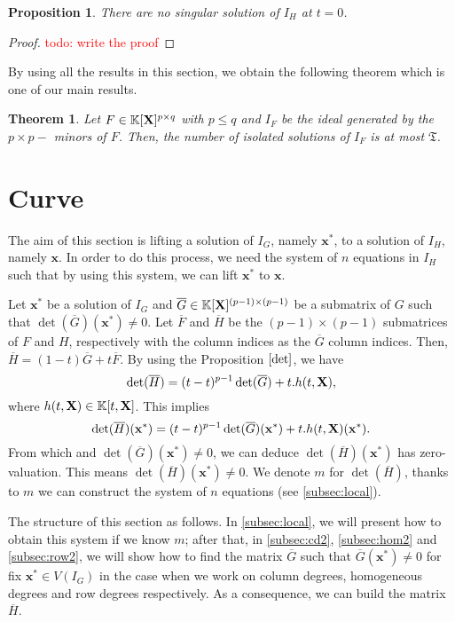 \documentclass[11pt]{article}
\numberwithin{Property}{section}
\newtheorem{Theorem}{Theorem}%
\numberwithin{Theorem}{section}
\newtheorem{Proposition}{Proposition}%
\numberwithin{Proposition}{section}
\numberwithin{Lemma}{section}
\numberwithin{Corollary}{section}
\numberwithin{Definition}{section}
\numberwithin{Remark}{section}
\numberwithin{Conjecture}{section}
\numberwithin{Problem}{section}
\numberwithin{Example}{section}
\numberwithin{Claim}{section}
\renewcommand{\leq}{\leqslant}
\def\bar{\overline}
\newcommand{\field}{\mathbb{K}} %
\newcommand{\mat}[1]{\mathbf{\MakeUppercase{#1}}} %
\newcommand{\todo}[1]{\textcolor{red}{#1}} %
\newcommand{\improve}[1]{\textcolor{blue}{#1}} %
\begin{document}
\begin{Proposition}
There are no singular solution of $I_H$ at $t = 0$.
\end{Proposition}
\begin{proof}
\todo{todo: write the proof}
\end{proof}
By using all the results in this section, we obtain the following theorem which is one of our main results.
\begin{Theorem}
Let $F \in \field[\mat{X}]^{p \times q}$ with $p \leq q$ and $I_F$ be the ideal generated by the $p \times p-$ minors of $F$. Then, the number of isolated solutions of $I_F$ is at most $\mathfrak{T}$. 
\end{Theorem}
\section{Curve}
The aim of this section is lifting a solution of $I_G$, namely $\mathbf{x}^*$, to a solution of $I_H$, namely $\mathbf{x}$. In order to do this process, we need the system of $n$ equations in $I_H$ such that by using this system, we can lift $\mathbf{x}^{*}$ to $\mathbf{x}$.

Let $\mathbf{x}^*$ be a solution of $I_G$ and $\bar{G} \in \field[\mat{X}]^{(p-1) \times (p-1)}$ be a submatrix of $G$ such that $\det(\bar{G})(\mathbf{x}^*) \ne 0$. Let $\bar{F}$ and $\bar{H}$ be the $(p-1) \times (p-1)$ submatrices of $F$ and $H$, respectively with the column indices as the $\bar{G}$ column indices. Then, $\bar{H} = (1-t)\bar{G} + t\bar{F}$. By using the Proposition $\ref{det}$, we have 
\[
\det(\bar{H}) = (t-t)^{p-1} \det(\bar{G}) + t.h(t,\mat{X}),
\] where $h(t,\mat{X}) \in \field[t,\mat{X}]$. This implies 
\[
\det(\bar{H})(\mathbf{x}^*) = (t-t)^{p-1} \det(\bar{G})(\mathbf{x}^*) + t.h(t,\mat{X})(\mathbf{x}^*). 
\] From which and $\det(\bar{G})(\mathbf{x}^*) \ne 0$, we can deduce $\det(\bar{H})(\mathbf{x}^*)$ has zero-valuation. This means $\det(\bar{H})(\mathbf{x}^*) \ne 0$. We denote $m$ for $\det(\bar{H})$, thanks to $m$ we can construct the system of $n$ equations (see \improve{\cref{subsec:local}}). 

The structure of this section as follows. In \improve{\cref{subsec:local}}, we will present how to obtain this system if we know $m$; after that, in \improve{\cref{subsec:cd2}}, \improve{\cref{subsec:hom2}} and \improve{\cref{subsec:row2}}, we will show how to find the matrix $\bar{G}$ such that $\bar{G}(\mathbf{x}^*) \ne 0$ for fix $\mathbf{x}^* \in V(I_G)$ in the case when we work on column degrees, homogeneous degrees and row degrees respectively. As a consequence, we can build the matrix $\bar{H}$. 
\end{document}
